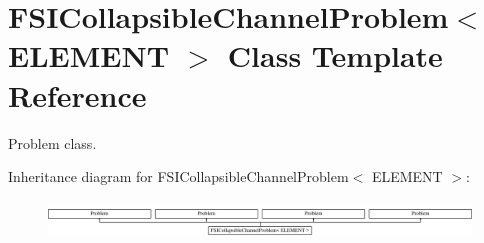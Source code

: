 \hypertarget{classFSICollapsibleChannelProblem}{}\section{F\+S\+I\+Collapsible\+Channel\+Problem$<$ E\+L\+E\+M\+E\+NT $>$ Class Template Reference}
\label{classFSICollapsibleChannelProblem}


Problem class.  


Inheritance diagram for F\+S\+I\+Collapsible\+Channel\+Problem$<$ E\+L\+E\+M\+E\+NT $>$\+:\begin{figure}[H]
\begin{center}
\leavevmode
\includegraphics[height=1.014493cm]{classFSICollapsibleChannelProblem}
\end{center}
\end{figure}
